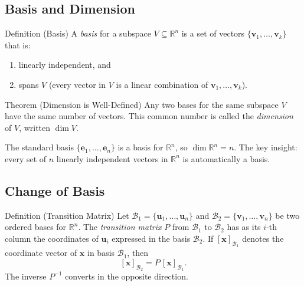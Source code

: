 \subsection*{Basis and Dimension}

\begin{propositionbox}{Definition (Basis)}
A \emph{basis} for a subspace $V \subseteq \mathbb{R}^n$ is a set of vectors
$\{\mathbf{v}_1, \ldots, \mathbf{v}_k\}$ that is:
\begin{enumerate}
  \item linearly independent, and
  \item spans $V$ (every vector in $V$ is a linear combination of $\mathbf{v}_1,\ldots,\mathbf{v}_k$).
\end{enumerate}
\end{propositionbox}

\begin{theorembox}{Theorem (Dimension is Well-Defined)}
Any two bases for the same subspace $V$ have the same number of vectors.
This common number is called the \emph{dimension} of $V$, written $\dim V$.
\end{theorembox}

\begin{remark*}
The standard basis $\{\mathbf{e}_1, \ldots, \mathbf{e}_n\}$ is a basis for $\mathbb{R}^n$,
so $\dim \mathbb{R}^n = n$.
The key insight: every set of $n$ linearly independent vectors in $\mathbb{R}^n$ is
automatically a basis.
\end{remark*}

\subsection*{Change of Basis}

\begin{propositionbox}{Definition (Transition Matrix)}
Let $\mathcal{B}_1 = \{\mathbf{u}_1, \ldots, \mathbf{u}_n\}$ and
$\mathcal{B}_2 = \{\mathbf{v}_1, \ldots, \mathbf{v}_n\}$ be two ordered bases for $\mathbb{R}^n$.
The \emph{transition matrix} $P$ from $\mathcal{B}_1$ to $\mathcal{B}_2$ has
as its $i$-th column the coordinates of $\mathbf{u}_i$ expressed in the basis $\mathcal{B}_2$.
If $[\mathbf{x}]_{\mathcal{B}_1}$ denotes the coordinate vector of $\mathbf{x}$ in basis $\mathcal{B}_1$, then
\[
  [\mathbf{x}]_{\mathcal{B}_2} = P \,[\mathbf{x}]_{\mathcal{B}_1}.
\]
The inverse $P^{-1}$ converts in the opposite direction.
\end{propositionbox}


